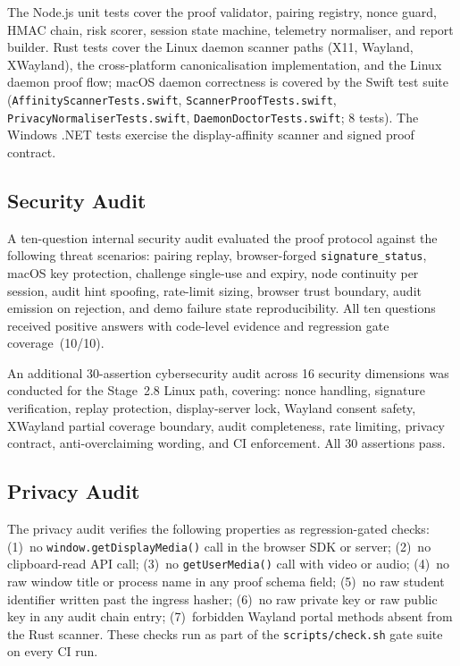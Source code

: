 \documentclass[conference]{IEEEtran}
\begin{document}
The Node.js unit tests cover the proof validator, pairing registry, nonce guard, HMAC chain, risk scorer, session state machine, telemetry normaliser, and report builder. Rust tests cover the Linux daemon scanner paths (X11, Wayland, XWayland), the cross-platform canonicalisation implementation, and the Linux daemon proof flow; macOS daemon correctness is covered by the Swift test suite (\texttt{AffinityScannerTests.swift}, \texttt{ScannerProofTests.swift}, \texttt{PrivacyNormaliserTests.swift}, \texttt{DaemonDoctorTests.swift}; 8 tests). The Windows .NET tests exercise the display-affinity scanner and signed proof contract.

\subsection{Security Audit}

A ten-question internal security audit evaluated the proof protocol against the following threat scenarios: pairing replay, browser-forged \texttt{signature\_status}, macOS key protection, challenge single-use and expiry, node continuity per session, audit hint spoofing, rate-limit sizing, browser trust boundary, audit emission on rejection, and demo failure state reproducibility. All ten questions received positive answers with code-level evidence and regression gate coverage~(10/10).

An additional 30-assertion cybersecurity audit across 16 security dimensions was conducted for the Stage~2.8 Linux path, covering: nonce handling, signature verification, replay protection, display-server lock, Wayland consent safety, XWayland partial coverage boundary, audit completeness, rate limiting, privacy contract, anti-overclaiming wording, and CI enforcement. All 30 assertions pass.

\subsection{Privacy Audit}

The privacy audit verifies the following properties as regression-gated checks: (1)~no \texttt{window.getDisplayMedia()} call in the browser SDK or server; (2)~no clipboard-read API call; (3)~no \texttt{getUserMedia()} call with video or audio; (4)~no raw window title or process name in any proof schema field; (5)~no raw student identifier written past the ingress hasher; (6)~no raw private key or raw public key in any audit chain entry; (7)~forbidden Wayland portal methods absent from the Rust scanner. These checks run as part of the \texttt{scripts/check.sh} gate suite on every CI run.
\end{document}
